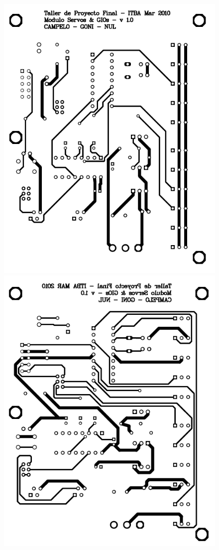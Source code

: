 \begin{figure}
\centering
	\includegraphics[scale=.3]{figuras/servo_top.png}
	\includegraphics[scale=.3]{figuras/servo_bottom.png}

\end{figure}

